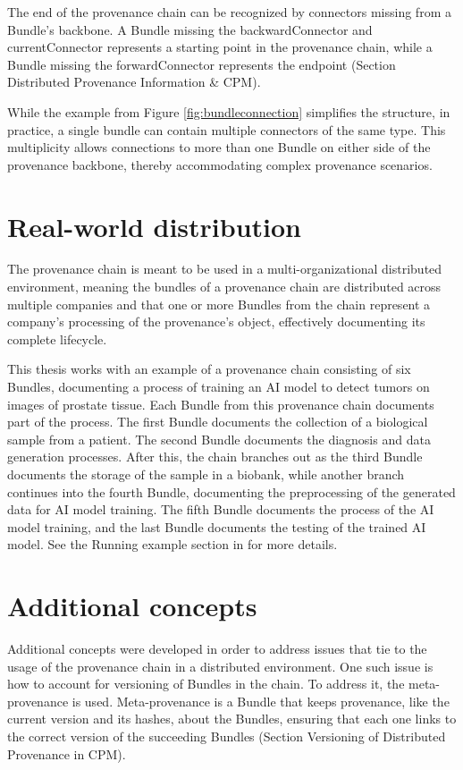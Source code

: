 \documentclass[
  digital,     %
  oneside,     %
  nosansbold,  %
  nocolorbold, %
  lof,         %
  lot,         %
]{fithesis4}
\begin{document}
The end of the provenance chain can be recognized by connectors missing from a Bundle's backbone. A Bundle missing the backwardConnector and currentConnector represents a starting point in the provenance chain, while a Bundle missing the forwardConnector represents the endpoint \cite{provchain} (Section Distributed Provenance Information \& CPM).

While the example from Figure \ref{fig:bundleconnection} simplifies the structure, in practice, a single bundle can contain multiple connectors of the same type. This multiplicity allows connections to more than one Bundle on either side of the provenance backbone, thereby accommodating complex provenance scenarios.

\shorthandon{-}

\section{Real-world distribution}
The provenance chain is meant to be used in a multi-organizational distributed environment, meaning the bundles of a provenance chain are distributed across multiple companies and that one or more Bundles from the chain represent a company's processing of the provenance's object, effectively documenting its complete lifecycle.

\label{t-aiexample} This thesis works with an example of a provenance chain consisting of six Bundles, documenting a process of training an AI model to detect tumors on images of prostate tissue. Each Bundle from this provenance chain documents part of the process. The first Bundle documents the collection of a biological sample from a patient. The second Bundle documents the diagnosis and data generation processes. After this, the chain branches out as the third Bundle documents the storage of the sample in a biobank, while another branch continues into the fourth Bundle, documenting the preprocessing of the generated data for AI model training. The fifth Bundle documents the process of the AI model training, and the last Bundle documents the testing of the trained AI model. See the Running example section in \cite{research} for more details.

\section{Additional concepts} \label{concepts}
Additional concepts were developed in order to address issues that tie to the usage of the provenance chain in a distributed environment. One such issue is how to account for versioning of Bundles in the chain. To address it, the meta-provenance is used. Meta-provenance is a Bundle that keeps provenance, like the current version and its hashes, about the Bundles, ensuring that each one links to the correct version of the succeeding Bundles \cite{provchain} (Section Versioning of Distributed Provenance in CPM).
\end{document}
